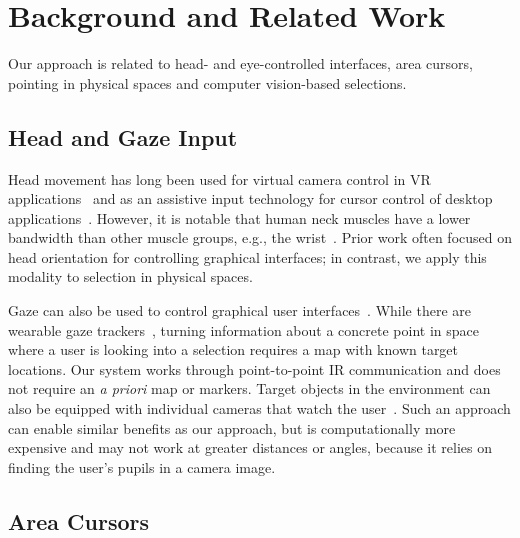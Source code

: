 \vfill

\section{Background and Related Work}
Our approach is related to head- and eye-controlled interfaces, area cursors, pointing in physical spaces and computer vision-based selections.


\subsection{Head and Gaze Input}
Head movement has long been used for virtual camera control in VR applications~\cite{pausch_user_1993} and as an assistive input technology for cursor control of desktop applications~\cite{radwin1990method}. However, it is notable that human neck muscles have a lower bandwidth than other muscle groups, e.g., the wrist~\cite{card_morphological_1991}.
%
%
Prior work often focused on head orientation for controlling graphical interfaces; in contrast, we apply this modality to selection in physical spaces.

Gaze can also be used to control graphical user interfaces~\cite{kumar2007eyepoint}. While there are wearable gaze trackers~\cite{bulling2009wearable}, turning information about a concrete point in space where a user is looking into a selection requires a map with known target locations.
Our system works through point-to-point IR communication and does not require an {\em a priori} map or markers. Target objects in the environment can also be equipped with individual cameras that watch the user~\cite{smith2013gaze,vertegaal2005media}. Such an approach can enable similar benefits as our approach, but is computationally more expensive and may not work at greater distances or angles, because it relies on finding the user's pupils in a camera image.


\subsection{Area Cursors}

